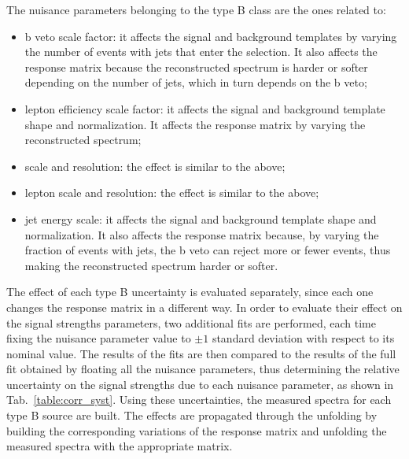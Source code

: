 The nuisance parameters belonging to the type B class are the ones related to:
\begin{itemize}
\item b veto scale factor: it affects the signal and background templates
by varying the number of events with jets that enter the selection. It also
affects the response matrix because the reconstructed spectrum is harder or softer depending on the number of jets, which in turn depends on the b veto;
\item lepton efficiency scale factor: it affects the signal and background
template shape and normalization. It affects the response matrix by varying
the reconstructed spectrum;
\item \MET scale and resolution: the effect is similar to the above;
\item lepton scale and resolution: the effect is similar to the above;
\item jet energy scale: it affects the signal and background template shape
and normalization. It also affects the response matrix because, by varying the
fraction of events with jets, the b veto can reject more or fewer events, thus
making the reconstructed spectrum harder or softer.
\end{itemize}
The effect of each type B uncertainty is evaluated separately,
since each one changes the response matrix in a different way.
In order to evaluate their effect on the signal strengths parameters, two additional fits are
performed, each time fixing  the nuisance parameter value to $\pm 1$  standard
deviation with respect
to its nominal value. The results of the fits are then compared to the results of the full fit obtained by floating  all the nuisance parameters, thus 
determining the relative uncertainty on the signal strengths due to each
nuisance parameter, as shown in Tab.~\ref{table:corr_syst}. 
Using these uncertainties, the measured spectra for each type B
source are built.
The effects are propagated through the unfolding by building the corresponding variations of the response matrix and unfolding the
measured spectra with the appropriate matrix.
